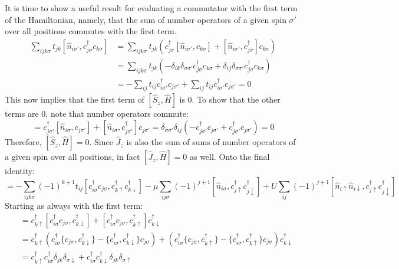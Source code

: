 \documentclass{article}
\begin{document}
It is time to show a useful result for evaluating a commutator with the first term of the Hamiltonian, namely, that the sum of number operators of a given spin $\sigma'$ over all positions commutes with the first term. 
\begin{align*}
\sum_{ijk\sigma} t_{jk}[\hat{n}_{i\sigma'}, c_{j\sigma}^\dagger c_{k\sigma}] &= \sum_{ijk\sigma} t_{jk}(c_{j\sigma}^\dagger [\hat{n}_{i\sigma'}, c_{k\sigma}] + [\hat{n}_{i\sigma'}, c_{j\sigma}^\dagger] c_{k\sigma}) \\
&= \sum_{ijk\sigma} t_{jk} ( -\delta_{ik} \delta_{\sigma \sigma'} c_{j\sigma}^\dagger c_{k\sigma} + \delta_{ij} \delta_{\sigma \sigma'} c_{j\sigma}^\dagger c_{k\sigma}) \\
&= -\sum_{ij} t_{ij} c_{i\sigma'}^\dagger c_{j\sigma'} + \sum_{ij} t_{ij} c_{i\sigma'}^\dagger c_{j\sigma'} = 0
\end{align*}
This now implies that the first term of $[\hat{S}_z, \hat{H}]$ is 0. To show that the other terms are 0, note that number operators commute: 
\begin{equation*}
[\hat{n}_{i\sigma}, c_{j\sigma'}^\dagger c_{j\sigma'}] = c_{j\sigma'}^\dagger [\hat{n}_{i\sigma}, c_{j\sigma'}] + [\hat{n}_{i\sigma}, c_{j\sigma'}^\dagger] c_{j\sigma'} = \delta_{\sigma\sigma'} \delta_{ij} (-c_{j\sigma'}^\dagger c_{j\sigma'} + c_{j\sigma'}^\dagger c_{j\sigma'}) = 0
\end{equation*}
Therefore, $[\hat{S}_z, \hat{H}] = 0$. Since $\hat{J}_z$ is also the sum of sums of number operators of a given spin over all positions, in fact $[\hat{J}_z, \hat{H}] = 0$ as well. Onto the final identity:
\begin{equation*}
[\hat{H}, \hat{J}_+] = -\sum_{ijk\sigma} (-1)^{k+1} t_{ij} [c_{i\sigma}^\dagger c_{j\sigma}, c_{k\uparrow}^\dagger c_{k\downarrow}^\dagger] - \mu\sum_{ij \sigma} (-1)^{j+1} [\hat{n}_{i\sigma}, c_{j\uparrow}^\dagger c_{j\downarrow}^\dagger] + U\sum_{ij}(-1)^{j+1} [\hat{n}_{i\uparrow} \hat{n}_{i\downarrow}, c_{j\uparrow}^\dagger c_{j\downarrow}^\dagger]
\end{equation*}
Starting as always with the first term:
\begin{align*}
[c_{i\sigma}^\dagger c_{j\sigma}, c_{k\uparrow}^\dagger c_{k\downarrow}^\dagger] &= c_{k\uparrow}^\dagger [ c_{i\sigma}^\dagger c_{j\sigma}, c_{k\downarrow}^\dagger] + [c_{i\sigma}^\dagger c_{j\sigma}, c_{k\uparrow}^\dagger] c_{k\downarrow}^\dagger \\
&= c_{k\uparrow}^\dagger (c_{i\sigma}^\dagger \{ c_{j\sigma}, c_{k\downarrow}^\dagger \} - \{c_{i\sigma}^\dagger, c_{k\downarrow}^\dagger \} c_{j\sigma}) + (c_{i\sigma}^\dagger \{c_{j\sigma}, c_{k\uparrow}^\dagger\} - \{ c_{i\sigma}^\dagger, c_{k\uparrow}^\dagger \} c_{j\sigma}) c_{k\downarrow}^\dagger \\
&= c_{k\uparrow}^\dagger c_{i\sigma}^\dagger \delta_{jk} \delta_{\sigma\downarrow} + c_{i\sigma}^\dagger c_{k\downarrow}^\dagger \delta_{jk} \delta_{\sigma\uparrow} 
\end{align*}
\end{document}
